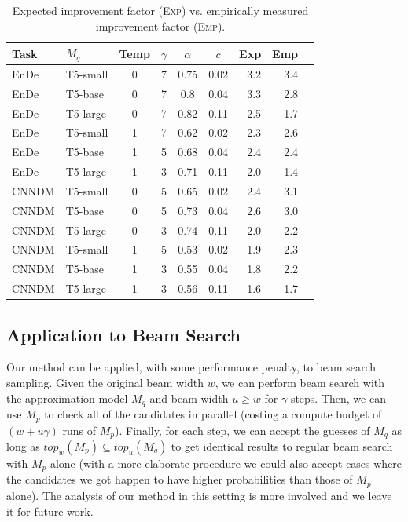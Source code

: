 \documentclass[nohyperref]{article}
\theoremstyle{plain}
\theoremstyle{definition}
\theoremstyle{remark}
\begin{document}
\begin{table}[ht]
  \caption{Expected improvement factor (\textsc{Exp}) vs. empirically measured improvement factor (\textsc{Emp}).}
  \label{tbl:t5 reality vs theory}
\vskip 0.15in
\begin{center}
\begin{small}
\begin{sc}
\begin{tabular}{llccccrrr}
\toprule
Task & $M_q$ & Temp & $\gamma$ & $\alpha$ & $c$ & Exp & Emp \\
\midrule
EnDe & T5-small & 0 & 7 &  0.75  & 0.02 & 3.2 & 3.4 \\
EnDe & T5-base & 0 & 7 &  0.8  & 0.04 & 3.3 & 2.8 \\
EnDe & T5-large & 0 & 7 &  0.82  & 0.11 & 2.5 & 1.7 \\
EnDe & T5-small & 1 & 7 &  0.62  & 0.02 & 2.3 & 2.6 \\
EnDe & T5-base & 1 & 5 &  0.68  & 0.04 & 2.4 & 2.4 \\
EnDe & T5-large & 1 & 3 &  0.71  & 0.11 & 2.0 & 1.4 \\
\midrule
CNNDM & T5-small & 0 & 5 &  0.65  & 0.02 & 2.4 & 3.1 \\
CNNDM & T5-base & 0 & 5 &  0.73  & 0.04 & 2.6 & 3.0 \\
CNNDM & T5-large & 0 & 3 &  0.74  & 0.11 & 2.0 & 2.2 \\
CNNDM & T5-small & 1 & 5 &  0.53  & 0.02 & 1.9 & 2.3 \\
CNNDM & T5-base & 1 & 3 &  0.55  & 0.04 & 1.8 & 2.2 \\
CNNDM & T5-large & 1 & 3 &  0.56  & 0.11 & 1.6 & 1.7 \\
\bottomrule
\end{tabular}
\end{sc}
\end{small}
\end{center}
\vskip -0.1in
\end{table}




\subsection{Application to Beam Search}
\label{sec:beam}
Our method can be applied, with some performance penalty, to beam search sampling. Given the original beam width $w$, we can perform beam search with the approximation model $M_q$ and beam width $u \geq w$ for $\gamma$ steps. Then, we can use $M_p$ to check all of the candidates in parallel (costing a compute budget of $(w + u\gamma)$ runs of $M_p$). Finally, for each step, we can accept the guesses of $M_q$ as long as $top_w(M_p) \subseteq top_u(M_q)$ to get identical results to regular beam search with $M_p$ alone (with a more elaborate procedure we could also accept cases where the candidates we got happen to have higher probabilities than those of $M_p$ alone). The analysis of our method in this setting is more involved and we leave it for future work.
\end{document}
